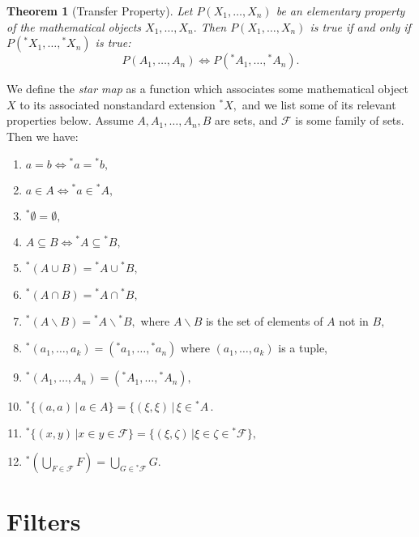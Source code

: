 \documentclass[12pt]{amsart}
\newcommand{\stt}{{}^*}
\theoremstyle{plain}
\newtheorem{thm}{Theorem}
\theoremstyle{definition}
\theoremstyle{remark}
\theoremstyle{theorem}
\numberwithin{equation}{section}
\numberwithin{thm}{section}
\begin{document}
\begin{thm}[Transfer Property]
\label{transferproperty} Let $P(X_1, \ldots , X_n)$ be an elementary property of the mathematical objects $X_1, \ldots , X_n.$ Then $P(X_1, \ldots , X_n)$ is true if and only if $P({}^*X_1, \ldots , {}^*X_n)$ is true:
\[ P(A_1, \ldots , A_n) \Longleftrightarrow P({}^*A_1, \ldots , {}^*A_n).\]
\end{thm}
We define the \textit{star map} as a function which associates some mathematical object $X$ to its associated nonstandard extension $^*X,$ and we list some of its relevant properties below. Assume $A, A_1, \ldots, A_n, B$ are sets, and $\mathscr{F}$ is some family of sets. Then we have:
\begin{enumerate}
    \item $a=b \iff \stt a = \stt b,$
    \item $a \in A \iff \stt a \in \stt A,$
    \item $\stt \emptyset = \emptyset,$
    \item $A \subseteq B \iff \stt A \subseteq \stt B,$
    \item $\stt (A \cup B) = \stt A \cup \stt B,$
    \item $\stt (A \cap B) = \stt A \cap \stt B,$
    \item $\stt (A \backslash B) = \stt A \backslash \stt B,$ where $A \backslash B$ is the set of elements of $A$ not in $B,$
    \item $\stt (a_1, \ldots , a_k) = (\stt a_1, \ldots , \stt a_n)$ where $(a_1, \ldots, a_k)$ is a tuple,
    \item $\stt ( A_1 , \ldots , A_n) = (\stt A_1, \ldots , \stt A_n),$
    \item $ \stt \{(a,a) \, | \, a \in A\} = \{(\xi, \xi) \, | \, \xi \in \stt A \,.$
    \item $\stt \{(x,y) \, | x \in y \in \mathscr{F} \} = \{(\xi,\zeta) \, | \xi \in \zeta \in \stt \mathscr{F} \},$
    \item $\stt\left(\bigcup _{F \in \mathscr F} F \right) = \bigcup _{G \in \stt \mathscr{F}}G.$
    
\end{enumerate}
\section{Filters}
\end{document}

